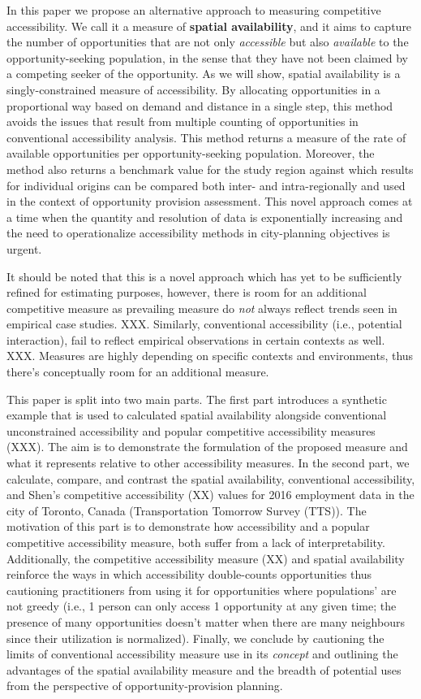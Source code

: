 \documentclass[]{elsarticle} %
\begin{document}
In this paper we propose an alternative approach to measuring
competitive accessibility. We call it a measure of \textbf{spatial
availability}, and it aims to capture the number of opportunities that
are not only \emph{accessible} but also \emph{available} to the
opportunity-seeking population, in the sense that they have not been
claimed by a competing seeker of the opportunity. As we will show,
spatial availability is a singly-constrained measure of accessibility.
By allocating opportunities in a proportional way based on demand and
distance in a single step, this method avoids the issues that result
from multiple counting of opportunities in conventional accessibility
analysis. This method returns a measure of the rate of available
opportunities per opportunity-seeking population. Moreover, the method
also returns a benchmark value for the study region against which
results for individual origins can be compared both inter- and
intra-regionally and used in the context of opportunity provision
assessment. This novel approach comes at a time when the quantity and
resolution of data is exponentially increasing and the need to
operationalize accessibility methods in city-planning objectives is
urgent.

It should be noted that this is a novel approach which has yet to be
sufficiently refined for estimating purposes, however, there is room for
an additional competitive measure as prevailing measure do \emph{not}
always reflect trends seen in empirical case studies. XXX. Similarly,
conventional accessibility (i.e., potential interaction), fail to
reflect empirical observations in certain contexts as well. XXX.
Measures are highly depending on specific contexts and environments,
thus there's conceptually room for an additional measure.

This paper is split into two main parts. The first part introduces a
synthetic example that is used to calculated spatial availability
alongside conventional unconstrained accessibility and popular
competitive accessibility measures (XXX). The aim is to demonstrate the
formulation of the proposed measure and what it represents relative to
other accessibility measures. In the second part, we calculate, compare,
and contrast the spatial availability, conventional accessibility, and
Shen's competitive accessibility (XX) values for 2016 employment data in
the city of Toronto, Canada (Transportation Tomorrow Survey (TTS)). The
motivation of this part is to demonstrate how accessibility and a
popular competitive accessibility measure, both suffer from a lack of
interpretability. Additionally, the competitive accessibility measure
(XX) and spatial availability reinforce the ways in which accessibility
double-counts opportunities thus cautioning practitioners from using it
for opportunities where populations' are not greedy (i.e., 1 person can
only access 1 opportunity at any given time; the presence of many
opportunities doesn't matter when there are many neighbours since their
utilization is normalized). Finally, we conclude by cautioning the
limits of conventional accessibility measure use in its \emph{concept}
and outlining the advantages of the spatial availability measure and the
breadth of potential uses from the perspective of opportunity-provision
planning.
\end{document}
